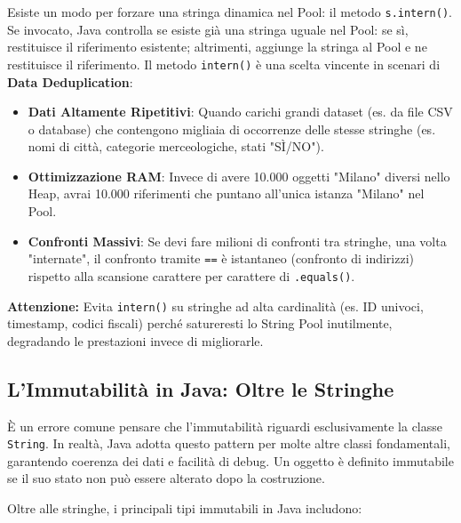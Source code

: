 \begin{tip}
    Esiste un modo per forzare una stringa dinamica nel Pool: il metodo \texttt{s.intern()}. Se invocato, Java controlla se esiste già una stringa uguale nel Pool: se sì, restituisce il riferimento esistente; altrimenti, aggiunge la stringa al Pool e ne restituisce il riferimento.
    Il metodo \texttt{intern()} è una scelta vincente in scenari di \textbf{Data Deduplication}:

\begin{itemize}
    \item \textbf{Dati Altamente Ripetitivi}: Quando carichi grandi dataset (es. da file CSV o database) che contengono migliaia di occorrenze delle stesse stringhe (es. nomi di città, categorie merceologiche, stati "SÌ/NO").
    \item \textbf{Ottimizzazione RAM}: Invece di avere 10.000 oggetti "Milano" diversi nello Heap, avrai 10.000 riferimenti che puntano all'unica istanza "Milano" nel Pool.
    \item \textbf{Confronti Massivi}: Se devi fare milioni di confronti tra stringhe, una volta "internate", il confronto tramite \texttt{==} è istantaneo (confronto di indirizzi) rispetto alla scansione carattere per carattere di \texttt{.equals()}.
\end{itemize}

\textbf{Attenzione:} Evita \texttt{intern()} su stringhe ad alta cardinalità (es. ID univoci, timestamp, codici fiscali) perché satureresti lo String Pool inutilmente, degradando le prestazioni invece di migliorarle.
\end{tip}

\subsection{L'Immutabilità in Java: Oltre le Stringhe}

È un errore comune pensare che l'immutabilità riguardi esclusivamente la classe \texttt{String}. In realtà, Java adotta questo pattern per molte altre classi fondamentali, garantendo coerenza dei dati e facilità di debug. Un oggetto è definito immutabile se il suo stato non può essere alterato dopo la costruzione.

Oltre alle stringhe, i principali tipi immutabili in Java includono:

